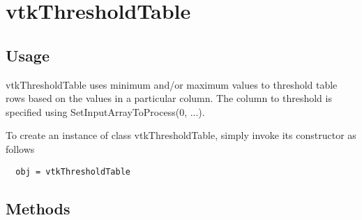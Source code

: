 \section{vtkThresholdTable}

\subsection{Usage}

 vtkThresholdTable uses minimum and/or maximum values to threshold
 table rows based on the values in a particular column.
 The column to threshold is specified using SetInputArrayToProcess(0, ...).

To create an instance of class vtkThresholdTable, simply
invoke its constructor as follows
\begin{verbatim}
  obj = vtkThresholdTable
\end{verbatim}
\subsection{Methods}


